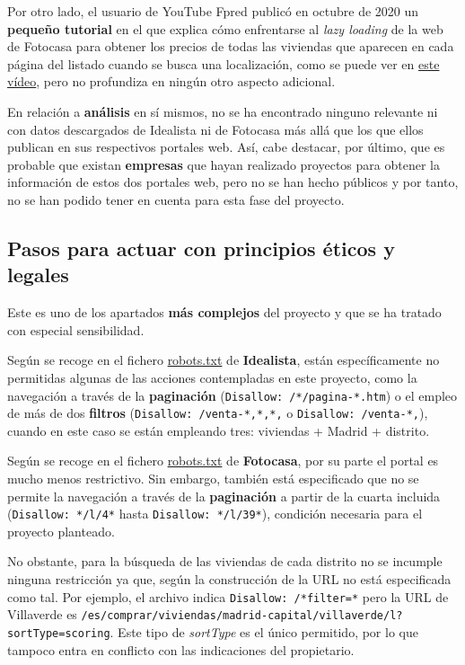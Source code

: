 \documentclass[12pt]{article}
\begin{document}
Por otro lado, el usuario de YouTube Fpred publicó en octubre de 2020 un \textbf{pequeño tutorial} en el que explica cómo enfrentarse al \textit{lazy loading} de la web de Fotocasa para obtener los precios de todas las viviendas que aparecen en cada página del listado cuando se busca una localización, como se puede ver en \href{https://www.youtube.com/watch?v=WMjV7rF3oX8}{este vídeo}, pero no profundiza en ningún otro aspecto adicional. 

En relación a \textbf{análisis} en sí mismos, no se ha encontrado ninguno relevante ni con datos descargados de Idealista ni de Fotocasa más allá que los que ellos publican en sus respectivos portales web. Así, cabe destacar, por último, que es probable que existan \textbf{empresas} que hayan realizado proyectos para obtener la información de estos dos portales web, pero no se han hecho públicos y por tanto, no se han podido tener en cuenta para esta fase del proyecto. 

\vspace{-1.5em}\subsection*{Pasos para actuar con principios éticos y legales}\vspace{-1.0em}

Este es uno de los apartados \textbf{más complejos} del proyecto y que se ha tratado con especial sensibilidad.

Según se recoge en el fichero \href{https://www.idealista.com/robots.txt}{robots.txt} de \textbf{Idealista}, están específicamente no permitidas algunas de las acciones contempladas en este proyecto, como la navegación a través de la \textbf{paginación} (\verb|Disallow: /*/pagina-*.htm|) o el empleo de más de dos \textbf{filtros} (\verb|Disallow: /venta-*,*,*,| o \verb|Disallow: /venta-*,|), cuando en este caso se están empleando tres: viviendas + Madrid + distrito. 

Según se recoge en el fichero \href{https://www.fotocasa.es/robots.txt}{robots.txt} de \textbf{Fotocasa}, por su parte el portal es mucho menos restrictivo. Sin embargo, también está especificado que no se permite la navegación a través de la \textbf{paginación} a partir de la cuarta incluida (\verb|Disallow: */l/4*| hasta \verb|Disallow: */l/39*|), condición necesaria para el proyecto planteado.

No obstante, para la búsqueda de las viviendas de cada distrito no se incumple ninguna restricción ya que, según la construcción de la URL no está especificada como tal. Por ejemplo, el archivo indica \verb|Disallow: /*filter=*| pero la URL de Villaverde es \verb|/es/comprar/viviendas/madrid-capital/villaverde/l?sortType=scoring|. Este tipo de \textit{sortType} es el único permitido, por lo que tampoco entra en conflicto con las indicaciones del propietario. 
\end{document}
